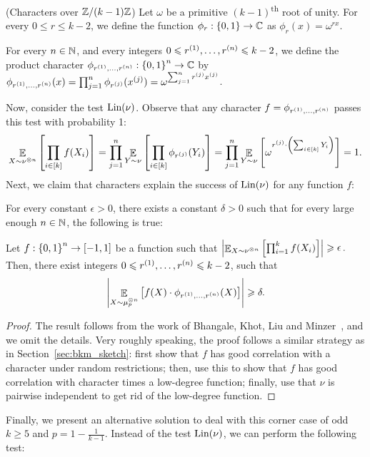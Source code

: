 \begin{definition}\label{defn:char}(Characters over $\mathbb{Z}/(k-1)\mathbb{Z}$)
Let $\omega$ be a primitive $(k-1)$\textsuperscript{th} root of unity.
For every $0\leq r\leq k-2$, we define the function $\phi_r: \left\{ 0,1 \right\} \to \mathbb{C}$ as $\phi_r(x)=\omega^{rx}$.

For every $n\in \mathbb{N}$, and every integers $0\leqslant r^{\left( 1 \right)},\dots,r^{\left( n \right)}\leqslant k-2$, we define the product character $\phi_{r^{\left( 1 \right)},\dots,r^{\left( n \right)}}:\left\{ 0,1 \right\}^n\to \mathbb{C}$ by $\phi_{r^{\left( 1 \right)},\dots,r^{\left( n \right)}}(x) = \prod_{j=1}^n\phi_{r^{\left( j \right)}}(x^{\left( j \right)}) = \omega^{\sum_{j=1}^n r^{\left( j \right)}x^{\left( j \right)}}$.
\end{definition} 

Now, consider the test $\textnormal{Lin}(\nu)$.
Observe that any character $f = \phi_{r^{\left( 1 \right)},\dots,r^{\left( n \right)}}$ passes this test with probability 1:
\[ \mathop{\mathbb{E}}_{X\sim\nu^{\otimes n}}\left[ \prod_{i\in [k]}f(X_i) \right] = \prod_{j=1}^n \mathop{\mathbb{E}}_{Y\sim\nu}\left[ \prod_{i\in [k]}\phi_{r^{\left( j \right)}}(Y_i) \right] = \prod_{j=1}^n \mathop{\mathbb{E}}_{Y\sim\nu}\left[ \omega^{r^{\left( j \right)}\cdot \left( \sum_{i\in [k]}{Y_i} \right)} \right] = 1.\]
Next, we claim that characters explain the success of $\textnormal{Lin}(\nu)$ for any function $f$:

\begin{theorem}
	For every constant $\epsilon > 0$, there exists a constant $\delta >0$ such that for every large enough $n\in \mathbb{N}$, the following is true:
	
	Let $f:\left\{ 0,1 \right\}^n\to[-1,1]$ be a function such that $\left|\mathop{\mathbb{E}}_{X\sim \nu^{\otimes n}} \left[ \prod_{i=1}^k f(X_i) \right] \right|\geqslant \mathop{\epsilon}.$
	Then, there exist integers $0\leqslant r^{\left( 1 \right)},\dots,r^{\left( n \right)}\leqslant k-2$, such that
	\[ \left|\mathop{\mathbb{E}}_{X\sim \mu_p^{\otimes n}}\left[ f(X)\cdot \phi_{r^{\left( 1 \right)},\dots,r^{\left( n \right)}}(X) \right]\right| \geqslant \delta .\]
\end{theorem}
\begin{proof}
	The result follows from the work of Bhangale, Khot, Liu and Minzer~\cite{BKLM24a, BKLM24b}, and we omit the details.
	Very roughly speaking, the proof follows a similar strategy as in Section~\ref{sec:bkm_sketch}: first show that $f$ has good correlation with a character under random restrictions; then, use this to show that $f$ has good correlation with character times a low-degree function; finally, use that $\nu$ is pairwise independent to get rid of the low-degree function.
\end{proof}

Finally, we present an alternative solution to deal with this corner case of odd $k\geq 5$ and $p=1-\frac{1}{k-1}$.
Instead of the test $\textnormal{Lin}(\nu)$, we can perform the following test:

